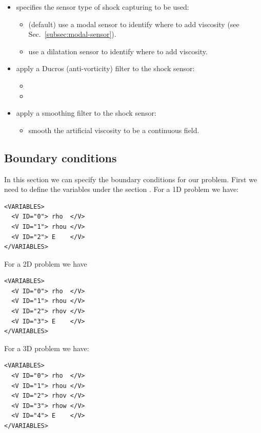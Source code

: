 \begin{itemize}
\begin{itemize}
    \end{itemize}
  \item {} specifies the sensor type of shock capturing to be used:
    \begin{itemize}
      \item {} (default) use a modal sensor to identify where to add viscosity (see Sec.~\ref{subsec:modal-sensor}).
      \item {} use a dilatation sensor to identify where to add viscosity.
    \end{itemize}
  \item {} apply a Ducros \cite{ducros1999large} (anti-vorticity) filter to the shock sensor:
    \begin{itemize}
      \item {}
      \item {}
    \end{itemize}
  \item {} apply a smoothing filter to the shock sensor:
    \begin{itemize}
      \item {} smooth the artificial viscosity to be a continuous field.
    \end{itemize}
\end{itemize}

\subsection*{Boundary conditions}
In this section we can specify the boundary conditions for our problem.
First we need to define the variables under the section .
For a 1D problem we have:
\begin{lstlisting}[style=XmlStyle]
<VARIABLES>
  <V ID="0"> rho  </V>
  <V ID="1"> rhou </V>
  <V ID="2"> E    </V>
</VARIABLES>
\end{lstlisting}

For a 2D problem we have
\begin{lstlisting}[style=XmlStyle]
<VARIABLES>
  <V ID="0"> rho  </V>
  <V ID="1"> rhou </V>
  <V ID="2"> rhov </V>
  <V ID="3"> E    </V>
</VARIABLES>
\end{lstlisting}

For a 3D problem we have:
\begin{lstlisting}[style=XmlStyle]
<VARIABLES>
  <V ID="0"> rho  </V>
  <V ID="1"> rhou </V>
  <V ID="2"> rhov </V>
  <V ID="3"> rhow </V>
  <V ID="4"> E    </V>
</VARIABLES>
\end{lstlisting}

